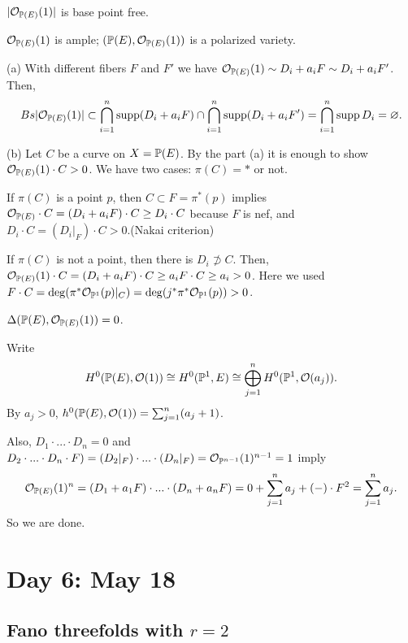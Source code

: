 \documentclass{../../small}
\begin{document}
\begin{prop}\,
\begin{parts}
\item $|\cO_{\P(E)}(1)|$ is base point free.
\item $\cO_{\P(E)}(1)$ is ample; $(\P(E),\cO_{\P(E)}(1))$ is a polarized variety.
\end{parts}
\end{prop}
\begin{pf}
(a)
With different fibers $F$ and $F'$ we have $\cO_{\P(E)}(1)\sim D_i+a_iF\sim D_i+a_iF'$.
Then,
\[Bs|\cO_{\P(E)}(1)|\subset\bigcap_{i=1}^n\supp(D_i+a_iF)\cap\bigcap_{i=1}^n\supp(D_i+a_iF')=\bigcap_{i=1}^n\supp D_i=\varnothing.\]

(b)
Let $C$ be a curve on $X=\P(E)$.
By the part (a) it is enough to show $\cO_{\P(E)}(1)\cdot C>0$.
We have two cases: $\pi(C)=*$ or not.

If $\pi(C)$ is a point $p$, then $C\subset F=\pi^*(p)$ implies $\cO_{\P(E)}\cdot C=(D_i+a_iF)\cdot C\ge D_i\cdot C$ because $F$ is nef, and $D_i\cdot C=(D_i|_F)\cdot C>0$.(Nakai criterion)

If $\pi(C)$ is not a point, then there is $D_i\not\supset C$.
Then, $\cO_{\P(E)}(1)\cdot C=(D_i+a_iF)\cdot C\ge a_iF\cdot C\ge a_i>0$.
Here we used $F\cdot C=\deg(\pi^*\cO_{\P^1}(p)|_C)=\deg(j^*\pi^*\cO_{\P^1}(p))>0$.
\end{pf}
\setcounter{thm}{15}
\begin{prop}
$\Delta(\P(E),\cO_{\P(E)}(1))=0$.
\end{prop}
\begin{pf}
Write
\[H^0(\P(E),\cO(1))\cong H^0(\P^1,E)\cong\bigoplus_{j=1}^nH^0(\P^1,\cO(a_j)).\]
By $a_j>0$, $h^0(\P(E),\cO(1))=\sum_{j=1}^n(a_j+1)$.

Also,
$D_1\cdot...\cdot D_n=0$ and $D_2\cdot...\cdot D_n\cdot F)=(D_2|_F)\cdot...\cdot(D_n|_F)=\cO_{\P^{n-1}}(1)^{n-1}=1$ imply
\[\cO_{\P(E)}(1)^n=(D_1+a_1F)\cdot...\cdot(D_n+a_nF)=0+\sum_{j=1}^na_j+(-)\cdot F^2=\sum_{j=1}^na_j.\]
So we are done.
\end{pf}

\newpage
\section{Day 6: May 18}

\subsection*{Fano threefolds with $r=2$}
\end{document}
